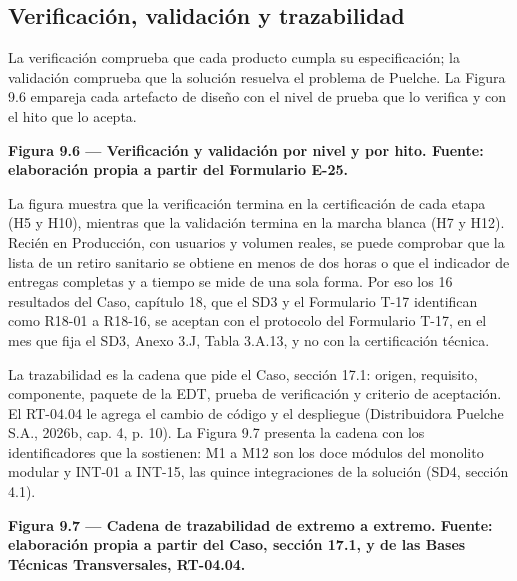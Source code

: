 \subsection{Verificación, validación y trazabilidad}

La verificación comprueba que cada producto cumpla su especificación; la validación comprueba que la solución resuelva el problema de Puelche. La Figura 9.6 empareja cada artefacto de diseño con el nivel de prueba que lo verifica y con el hito que lo acepta.



\textbf{Figura 9.6 — Verificación y validación por nivel y por hito. Fuente: elaboración propia a partir del Formulario E-25.}

La figura muestra que la verificación termina en la certificación de cada etapa (H5 y H10), mientras que la validación termina en la marcha blanca (H7 y H12). Recién en Producción, con usuarios y volumen reales, se puede comprobar que la lista de un retiro sanitario se obtiene en menos de dos horas o que el indicador de entregas completas y a tiempo se mide de una sola forma. Por eso los 16 resultados del Caso, capítulo 18, que el SD3 y el Formulario T-17 identifican como R18-01 a R18-16, se aceptan con el protocolo del Formulario T-17, en el mes que fija el SD3, Anexo 3.J, Tabla 3.A.13, y no con la certificación técnica.

La trazabilidad es la cadena que pide el Caso, sección 17.1: origen, requisito, componente, paquete de la EDT, prueba de verificación y criterio de aceptación. El RT-04.04 le agrega el cambio de código y el despliegue (Distribuidora Puelche S.A., 2026b, cap. 4, p. 10). La Figura 9.7 presenta la cadena con los identificadores que la sostienen: M1 a M12 son los doce módulos del monolito modular y INT-01 a INT-15, las quince integraciones de la solución (SD4, sección 4.1).



\textbf{Figura 9.7 — Cadena de trazabilidad de extremo a extremo. Fuente: elaboración propia a partir del Caso, sección 17.1, y de las Bases Técnicas Transversales, RT-04.04.}

